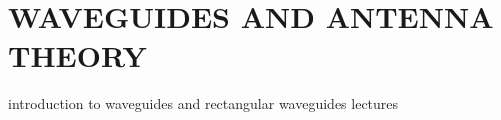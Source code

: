 \documentclass[a4paper,10pt, two column]{book}
\begin{document}

% 
% 
% 
% 
% 
% 
% 
% 
% 
% 
% 
% 
% 
% 
% 
% 
% 
% 
% 

\part{WAVEGUIDES AND ANTENNA THEORY}

introduction to waveguides and rectangular waveguides lectures














\end{document}
